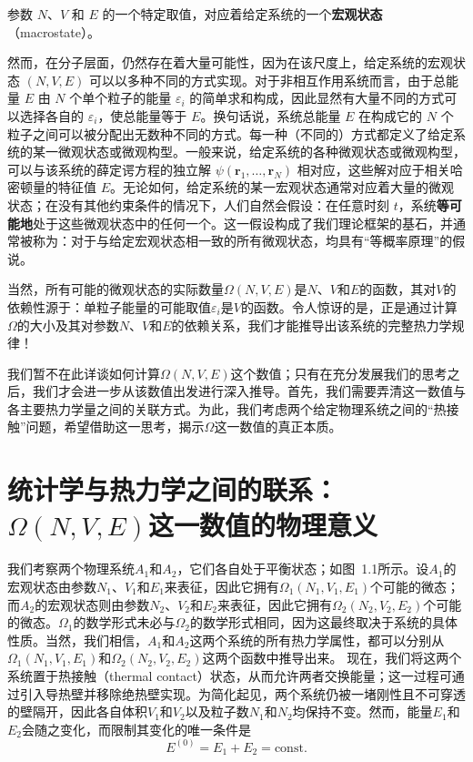 参数 \(N\)、\(V\) 和 \(E\) 的一个特定取值，对应着给定系统的一个\textbf{宏观状态}（macrostate）。

然而，在分子层面，仍然存在着大量可能性，因为在该尺度上，给定系统的宏观状态 \((N,V,E)\) 可以以多种不同的方式实现。对于非相互作用系统而言，由于总能量 \(E\) 由 \(N\) 个单个粒子的能量 \(\varepsilon_i\) 的简单求和构成，因此显然有大量不同的方式可以选择各自的 \(\varepsilon_i\)，使总能量等于 \(E\)。换句话说，系统总能量 \(E\) 在构成它的 \(N\) 个粒子之间可以被分配出无数种不同的方式。每一种（不同的）方式都定义了给定系统的某一微观状态或微观构型。一般来说，给定系统的各种微观状态或微观构型，可以与该系统的薛定谔方程的独立解 \(\psi(\boldsymbol{r}_1,\ldots,\boldsymbol{r}_N)\) 相对应，这些解对应于相关哈密顿量的特征值 \(E\)。无论如何，给定系统的某一宏观状态通常对应着大量的微观状态；在没有其他约束条件的情况下，人们自然会假设：在任意时刻 \(t\)，系统\textbf{等可能地}处于这些微观状态中的任何一个。这一假设构成了我们理论框架的基石，并通常被称为：对于与给定宏观状态相一致的所有微观状态，均具有``等概率原理''的假说。

当然，所有可能的微观状态的实际数量\(\Omega(N, V, E)\)是\(N\)、\(V\)和\(E\)的函数，其对\(V\)的依赖性源于：单粒子能量的可能取值\(\varepsilon_i\)是\(V\)的函数。令人惊讶的是，正是通过计算\(\Omega\)的大小及其对参数\(N\)、\(V\)和\(E\)的依赖关系，我们才能推导出该系统的完整热力学规律！

我们暂不在此详谈如何计算\(\Omega(N, V, E)\)这个数值；只有在充分发展我们的思考之后，我们才会进一步从该数值出发进行深入推导。首先，我们需要弄清这一数值与各主要热力学量之间的关联方式。为此，我们考虑两个给定物理系统之间的``热接触''问题，希望借助这一思考，揭示\(\Omega\)这一数值的真正本质。

\section{\texorpdfstring{统计学与热力学之间的联系：\(\Omega(N, V, E)\)这一数值的物理意义}{统计学与热力学之间的联系：\textbackslash Omega(N, V, E)这一数值的物理意义}}\label{section1.2}

我们考察两个物理系统\(A_{1}\)和\(A_{2}\)，它们各自处于平衡状态；如图~1.1所示。设\(A_{1}\)的宏观状态由参数\(N_{1}\)、\(V_{1}\)和\(E_{1}\)来表征，因此它拥有\(\Omega_{1}(N_{1}, V_{1}, E_{1})\)个可能的微态；而\(A_{2}\)的宏观状态则由参数\(N_{2}\)、\(V_{2}\)和\(E_{2}\)来表征，因此它拥有\(\Omega_{2}(N_{2}, V_{2}, E_{2})\)个可能的微态。\(\Omega_{1}\)的数学形式未必与\(\Omega_{2}\)的数学形式相同，因为这最终取决于系统的具体性质。当然，我们相信，\(A_{1}\)和\(A_{2}\)这两个系统的所有热力学属性，都可以分别从\(\Omega_{1}(N_{1}, V_{1}, E_{1})\)和\(\Omega_{2}(N_{2}, V_{2}, E_{2})\)这两个函数中推导出来。
现在，我们将这两个系统置于热接触（thermal contact）状态，从而允许两者交换能量；这一过程可通过引入导热壁并移除绝热壁实现。为简化起见，两个系统仍被一堵刚性且不可穿透的壁隔开，因此各自体积\(V_{1}\)和\(V_{2}\)以及粒子数\(N_{1}\)和\(N_{2}\)均保持不变。然而，能量\(E_{1}\)和\(E_{2}\)会随之变化，而限制其变化的唯一条件是
\begin{equation}\tag{1.2.3}\label{eq:1.2.3}
E ^{( 0 )} = E _ { 1 } + E _ { 2 } = \mathrm { c o n s t . }
\end{equation}

